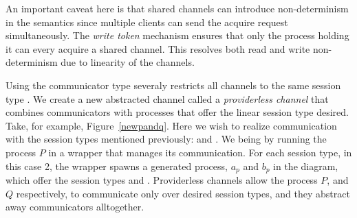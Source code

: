 
An important caveat here is that shared channels can introduce non-determinism
in the semantics since multiple clients can send the acquire request simultaneously.
The \emph{write token} mechanism ensures that only the process holding it can every acquire
a shared channel. 
This resolves both read and write non-determinism due to linearity of the channels.

Using the communicator type severaly restricts all channels to the same session type . 
We create a new abstracted channel called a \emph{providerless channel} that combines communicators with processes that offer the linear session type desired. 
Take, for example, Figure~\ref{newpandq}. Here we wish to realize communication with the session types mentioned previously:  and .
We being by running the process $P$ in a wrapper that manages its communication.
For each session type, in this case 2, the wrapper spawns a generated process, $a_p$ and $b_p$ in the diagram, which offer the session types  and . 
Providerless channels allow the process $P$, and $Q$ respectively, to communicate only over desired session types, and they abstract away communicators alltogether. 

